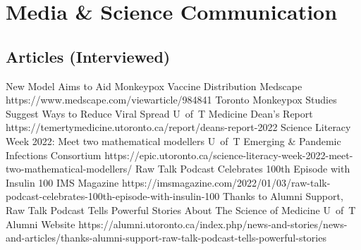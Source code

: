 \section{Media \& Science Communication}\onedate
\subsection{Articles (Interviewed)}
  {New Model Aims to Aid Monkeypox Vaccine Distribution}
  {Medscape}
  {https://www.medscape.com/viewarticle/984841}{}
  {Toronto Monkeypox Studies Suggest Ways to Reduce Viral Spread}
  {U~of~T Medicine Dean's Report}
  {https://temertymedicine.utoronto.ca/report/deans-report-2022}{}
  {Science Literacy Week 2022: Meet two mathematical modellers}
  {U~of~T Emerging \& Pandemic Infections Consortium}
  {https://epic.utoronto.ca/science-literacy-week-2022-meet-two-mathematical-modellers/}{}
  {Raw Talk Podcast Celebrates 100th Episode with Insulin 100}
  {IMS Magazine}
  {https://imsmagazine.com/2022/01/03/raw-talk-podcast-celebrates-100th-episode-with-insulin-100}{}
  {Thanks to Alumni Support, Raw Talk Podcast Tells Powerful Stories About The Science of Medicine}
  {U~of~T Alumni Website}
  {https://alumni.utoronto.ca/index.php/news-and-stories/news-and-articles/thanks-alumni-support-raw-talk-podcast-tells-powerful-stories}{}
